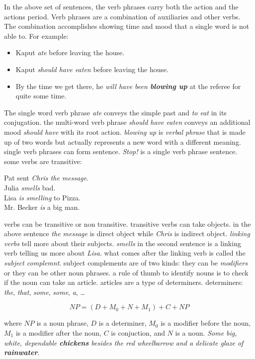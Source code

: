 \documentclass[a4paper]{article}
\begin{document}
In the above set of sentences, the verb phrases carry both the action and the actions period. Verb phrases are a combination of 
auxiliaries and other verbs. The combination accomplishes showing time and mood that a single word is not able to. For example:

\begin{itemize}
    \item Kaput \emph{ate} before leaving the house.
    \item Kaput \emph{should have eaten} before leaving the house.
    \item By the time we get there, he \emph{will have been \textbf{blowing up}} at the referee for quite some time.
\end{itemize}

The single word verb phrase \emph{ate} conveys the simple past and \emph{to eat} in its conjugation. the multi-word verb phrase 
\emph{should have eaten} conveys an additional mood \emph{should have} with its root action. \emph{blowing up} is \emph{verbal phrase}
that is made up of two words but actually represents a new word with a different meaning. single verb phrases can form sentence.
\emph{Stop!} is a single verb phrase sentence. some verbs are transitive:

\begin{flushleft}
    Pat sent \emph{Chris \emph{the message}}. \\
    Julia \emph{smells} bad. \\
    Lisa \emph{is smelling} to Pizza. \\
    Mr. Becker \emph{is} a big man.
\end{flushleft}

verbs can be transitive or non transitive. transitive verbs can take objects. in the above sentence \emph{the message} is direct object 
while \emph{Chris} is indirect object. \emph{linking verbs} tell more about their subjects. \emph{smells} in the second sentence is
a linking verb telling us more about \emph{Lisa}. what comes after the linking verb is called the \emph{subject complemnt}.
subject complements are of two kinds: they can be \emph{modifiers} or they can be other noun phrases. a rule of thumb to identify nouns
is to check if the noun can take an article. articles are a type of determiners. determiners: \emph{the}, \emph{that}, \emph{some},
\emph{some}, \emph{a}, \ldots

\[
    NP = (D + M_0 + N + M_1) + C + NP
\]

where \(NP\) is a noun phrase, \(D\) is a determiner, \(M_0\) is a modifier before the noun, \(M_1\) is a modifier after
the noun, \(C\) is conjuction, and \(N\) is a noun. \emph{Some big, white, dependable \textbf{chickens} besides the red
    wheelbarrow and a delicate glaze of \textbf{rainwater}}.
\end{document}
